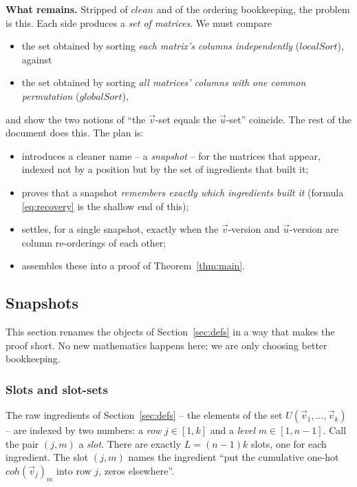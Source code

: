 \medskip
\noindent\textbf{What remains.}  Stripped of $clean$ and of the ordering bookkeeping,
the problem is this.  Each side produces a \emph{set of matrices}.  We must compare
\begin{itemize}
  \item the set obtained by sorting \emph{each matrix's columns independently}
        ($localSort$), against
  \item the set obtained by sorting \emph{all matrices' columns with one common
        permutation} ($globalSort$),
\end{itemize}
and show the two notions of ``the $\vec v$-set equals the $\vec u$-set'' coincide.
The rest of the document does this.  The plan is:
\begin{itemize}
  \item[\S\ref{sec:snapshots}] introduces a cleaner name -- a \emph{snapshot} --
        for the matrices that appear, indexed not by a position but by the set of
        ingredients that built it;
  \item[\S\ref{sec:remember}] proves that a snapshot \emph{remembers exactly which
        ingredients built it} (formula \eqref{eq:recovery} is the shallow end of
        this);
  \item[\S\ref{sec:align}] settles, for a single snapshot, exactly when the
        $\vec v$-version and $\vec u$-version are column re-orderings of each other;
  \item[\S\ref{sec:solution}] assembles these into a proof of
        Theorem~\ref{thm:main}.
\end{itemize}


\subsection{Snapshots}
\label{sec:snapshots}

This section renames the objects of Section~\ref{sec:defs} in a way that makes the proof short.
No new mathematics happens here; we are only choosing better bookkeeping.

\subsubsection*{Slots and slot-sets}

The raw ingredients of Section~\ref{sec:defs} -- the elements of the set
$U(\vec v_1,\ldots,\vec v_k)$ -- are indexed by two numbers: a \emph{row}
$j\in[1,k]$ and a \emph{level} $m\in[1,n-1]$.  Call the pair $(j,m)$ a \emph{slot}.
There are exactly $L=(n-1)k$ slots, one for each ingredient.  The slot $(j,m)$
names the ingredient ``put the cumulative one-hot $coh(\vec v_j)_m$ into row $j$,
zeros elsewhere''.

